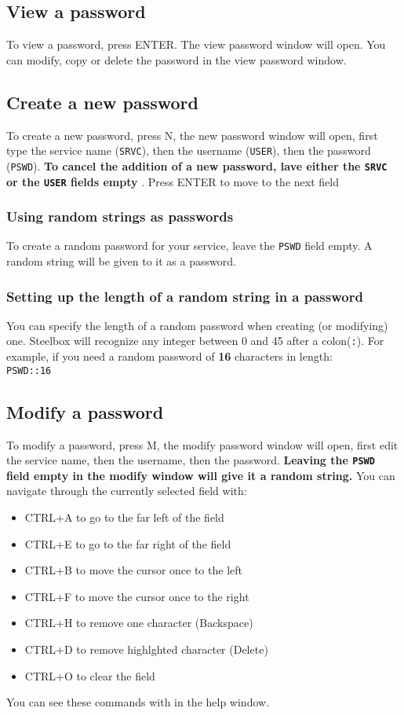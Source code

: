 \documentclass{article}
\begin{document}
  \subsection{View a password}
  To view a password, press ENTER. The view password window will open. You can modify, copy or delete the password in the view password window.

  \subsection{Create a new password}
  To create a new password, press N, the new password window will open, first type the service name (\texttt{SRVC}), then the username (\texttt{USER}),
  then the password (\texttt{PSWD}). \textbf{To cancel the addition of a new password, lave either the \texttt{SRVC} or the \texttt{USER} fields
  empty }. Press ENTER to move to the next field

  \subsubsection{Using random strings as passwords}
  To create a random password for your service, leave the \texttt{PSWD} field empty. A random string will be given to it as a password.

  \subsubsection{Setting up the length of a random string in a password}
  You can specify the length of a random password when creating (or modifying) one. Steelbox will recognize any integer between 0 and
  45 after a colon(\texttt{:}). For example, if you need a random password of \textbf{16} characters in length:\\
  \texttt{PSWD::16}

  \subsection{Modify a password}
  To modify a password, press M, the modify password window will open, first edit the service name, then the username,
  then the password. \textbf{Leaving the \texttt{PSWD} field empty in the modify window will give it a random string.}
  You can navigate through the currently selected field with:
  \begin{itemize}
    \item CTRL+A to go to the far left of the field  
    \item CTRL+E to go to the far right of the field
    \item CTRL+B to move the cursor once to the left
    \item CTRL+F to move the cursor once to the right
    \item CTRL+H to remove one character (Backspace)
    \item CTRL+D to remove highlghted character (Delete)
    \item CTRL+O to clear the field
  \end{itemize}
  You can see these commands with in the help window.
\end{document}
